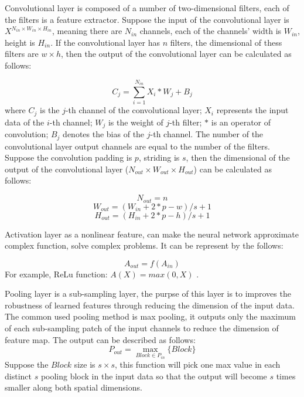 \documentclass[sensors,article,submit,moreauthors,pdftex,10pt,a4paper]{mdpi}
\begin{document}
Convolutional layer is composed of a number of two-dimensional filters, each of the filters is a feature extractor. Suppose the input of the convolutional layer is $X^{N_{in} \times W_{in} \times H_{in}}$, meaning there are $N_{in}$ channels, each of the channels' width is $W_{in}$, height is $H_{in}$. If the convolutional layer has $n$ filters, the dimensional of thess filters are $w \times h$, then the output of the convolutional layer can be calculated as follows\cite{ConvolutinFormula}:

\begin{equation}
C_j = \sum_{i=1}^{N_{in}}X_i*W_j + B_j
\end{equation}
where $C_j$ is the $j$-th channel of the convolutional layer; $X_i$ represents the input data of the $i$-th channel; $W_j$ is the weight of $j$-th filter; $*$ is an operator of convolution; $B_j$ denotes the bias of the $j$-th channel. The number of the convolutional layer output channels are equal to the number of the filters. Suppose the convolution padding is $p$, striding is $s$, then the dimensional of the output of the convolutional layer ($N_{out} \times W_{out} \times H_{out}$) can be calculated as follows:

\begin{equation}
N_{out} = n
\end{equation}
\begin{equation}
W_{out} = (W_{in} + 2*p -w) / s + 1
\end{equation}
\begin{equation}
H_{out} = (H_{in} + 2*p -h) / s + 1
\end{equation}

Activation layer as a nonlinear feature, can make the neural network approximate complex function, solve complex problems. It can be represent by the follows:

\begin{equation}
A_{out} = f(A_{in})
\end{equation}
For example, ReLu function\cite{ReLu}: $A(X) = max(0,X)$ .

Pooling layer is a sub-sampling layer, the purpse of this layer is to improves the robustness of learned features through reducing the dimension of the input data. The common used pooling method is max pooling, it outputs only the maximum of each sub-sampling patch of the input channels to reduce the dimension of feature map. The output can be described as follows\cite{ConvolutinFormula}:
\begin{equation}
P_{out} = \max_{Block\in{P_{in}}}\{Block\}
\end{equation}
Suppose the $Block$ size is $s \times s$, this function will pick one max value in each distinct $s$ pooling block in the input data so that the output will become $s$ times smaller along both spatial dimensions.
\end{document}
